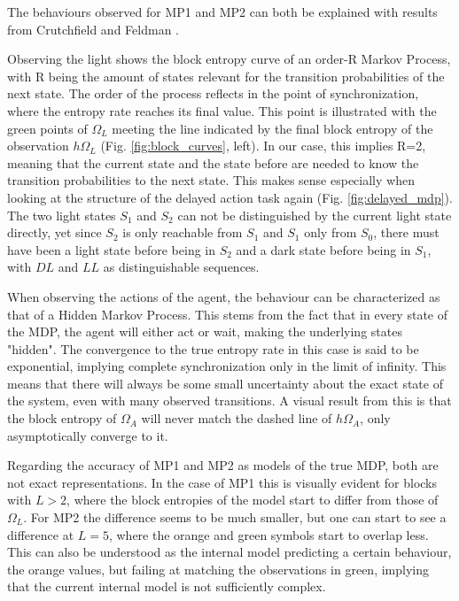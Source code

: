 \documentclass[12pt,a4paper]{article}
\begin{document}
The behaviours observed for MP1 and MP2 can both be explained with results from Crutchfield and Feldman \autocite{crutchfield2003regularities}.

Observing the light shows the block entropy curve of an order-R Markov Process, with R being the amount of states relevant for the transition probabilities of the next state.
The order of the process reflects in the point of synchronization, where the entropy rate reaches its final value.
This point is illustrated with the green points of $\Omega_L$ meeting the line indicated by the final block entropy of the observation $h \Omega_L$ (Fig. \ref{fig:block_curves}, left).
In our case, this implies R=2, meaning that the current state and the state before are needed to know the transition probabilities to the next state.
This makes sense especially when looking at the structure of the delayed action task again (Fig. \ref{fig:delayed_mdp}).
The two light states $S_1$ and $S_2$ can not be distinguished by the current light state directly, yet since $S_2$ is only reachable from $S_1$ and $S_1$ only from $S_0$, there must have been a light state before being in $S_2$ and a dark state before being in $S_1$, with $DL$ and $LL$ as distinguishable sequences.

When observing the actions of the agent, the behaviour can be characterized as that of a Hidden Markov Process.
This stems from the fact that in every state of the MDP, the agent will either act or wait, making the underlying states "hidden".
The convergence to the true entropy rate in this case is said to be exponential, implying complete synchronization only in the limit of infinity.
This means that there will always be some small uncertainty about the exact state of the system, even with many observed transitions.
A visual result from this is that the block entropy of $\Omega_A$ will never match the dashed line of $h \Omega_A$, only asymptotically converge to it.

Regarding the accuracy of MP1 and MP2 as models of the true MDP, both are not exact representations.
In the case of MP1 this is visually evident for blocks with $L > 2$, where the block entropies of the model start to differ from those of $\Omega_L$.
For MP2 the difference seems to be much smaller, but one can start to see a difference at $L=5$, where the orange and green symbols start to overlap less.
This can also be understood as the internal model predicting a certain behaviour, the orange values, but failing at matching the observations in green, implying that the current internal model is not sufficiently complex.
\end{document}
